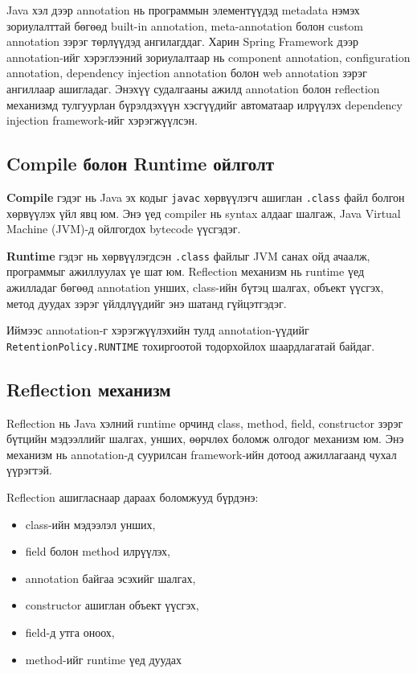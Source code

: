 Java хэл дээр annotation нь программын элементүүдэд metadata нэмэх зориулалттай бөгөөд built-in annotation, meta-annotation болон custom annotation зэрэг төрлүүдэд ангилагддаг. Харин Spring Framework дээр annotation-ийг хэрэглээний зориулалтаар нь component annotation, configuration annotation, dependency injection annotation болон web annotation зэрэг ангиллаар ашигладаг. Энэхүү судалгааны ажилд annotation болон reflection механизмд тулгуурлан бүрэлдэхүүн хэсгүүдийг автоматаар илрүүлэх dependency injection framework-ийг хэрэгжүүлсэн.

\newpage
\subsection{Compile болон Runtime ойлголт}

\textbf{Compile} гэдэг нь Java эх кодыг \texttt{javac} хөрвүүлэгч ашиглан \texttt{.class} файл болгон хөрвүүлэх үйл явц юм. Энэ үед compiler нь syntax алдааг шалгаж, Java Virtual Machine (JVM)-д ойлгогдох bytecode үүсгэдэг.

\textbf{Runtime} гэдэг нь хөрвүүлэгдсэн \texttt{.class} файлыг JVM санах ойд ачаалж, программыг ажиллуулах үе шат юм. Reflection механизм нь runtime үед ажилладаг бөгөөд annotation унших, class-ийн бүтэц шалгах, объект үүсгэх, метод дуудах зэрэг үйлдлүүдийг энэ шатанд гүйцэтгэдэг.

Иймээс annotation-г хэрэгжүүлэхийн тулд annotation-үүдийг \texttt{RetentionPolicy.}\allowbreak\texttt{RUNTIME} тохиргоотой тодорхойлох шаардлагатай байдаг.

\subsection{Reflection механизм}
Reflection нь Java хэлний runtime орчинд class, method, field, constructor зэрэг бүтцийн мэдээллийг шалгах, унших, өөрчлөх боломж олгодог механизм юм. Энэ механизм нь annotation-д суурилсан framework-ийн дотоод ажиллагаанд чухал үүрэгтэй.

Reflection ашигласнаар дараах боломжууд бүрдэнэ:
\begin{itemize}
    \item class-ийн мэдээлэл унших,
    \item field болон method илрүүлэх,
    \item annotation байгаа эсэхийг шалгах,
    \item constructor ашиглан объект үүсгэх,
    \item field-д утга оноох,
    \item method-ийг runtime үед дуудах
\end{itemize}


